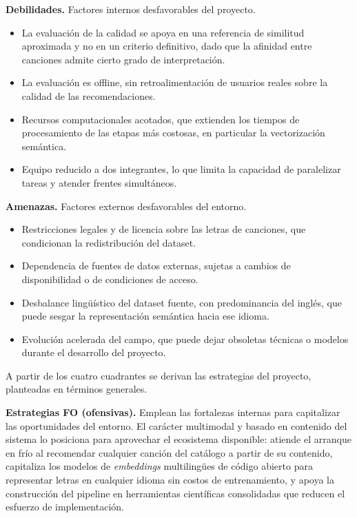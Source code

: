 \textbf{Debilidades.} Factores internos desfavorables del proyecto.
\begin{itemize}
    \item La evaluación de la calidad se apoya en una referencia de similitud aproximada y no en un criterio definitivo, dado que la afinidad entre canciones admite cierto grado de interpretación.
    \item La evaluación es offline, sin retroalimentación de usuarios reales sobre la calidad de las recomendaciones.
    \item Recursos computacionales acotados, que extienden los tiempos de procesamiento de las etapas más costosas, en particular la vectorización semántica.
    \item Equipo reducido a dos integrantes, lo que limita la capacidad de paralelizar tareas y atender frentes simultáneos.
\end{itemize}

\textbf{Amenazas.} Factores externos desfavorables del entorno.
\begin{itemize}
    \item Restricciones legales y de licencia sobre las letras de canciones, que condicionan la redistribución del dataset.
    \item Dependencia de fuentes de datos externas, sujetas a cambios de disponibilidad o de condiciones de acceso.
    \item Desbalance lingüístico del dataset fuente, con predominancia del inglés, que puede sesgar la representación semántica hacia ese idioma.
    \item Evolución acelerada del campo, que puede dejar obsoletas técnicas o modelos durante el desarrollo del proyecto.
\end{itemize}

A partir de los cuatro cuadrantes se derivan las estrategias del proyecto, planteadas en términos generales.

\textbf{Estrategias FO (ofensivas).} Emplean las fortalezas internas para capitalizar las oportunidades del entorno. El carácter multimodal y basado en contenido del sistema lo posiciona para aprovechar el ecosistema disponible: atiende el arranque en frío al recomendar cualquier canción del catálogo a partir de su contenido, capitaliza los modelos de \textit{embeddings} multilingües de código abierto para representar letras en cualquier idioma sin costos de entrenamiento, y apoya la construcción del pipeline en herramientas científicas consolidadas que reducen el esfuerzo de implementación.

